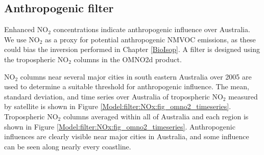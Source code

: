     
    
  
      
    
  \subsection{Anthropogenic filter}
    \label{Model:filter:NOx}
    
    Enhanced NO$_2$ concentrations indicate anthropogenic influence over Australia.
    We use NO$_2$ as a proxy for potential anthropogenic NMVOC emissions, as these could bias the inversion performed in Chapter \ref{BioIsop}.
    A filter is designed using the tropospheric NO$_2$ columns in the OMNO2d product.
    
    NO$_2$ columns near several major cities in south eastern Australia over 2005 are used to determine a suitable threshold for anthropogenic influence.
    The mean, standard deviation, and time series over Australia of tropospheric NO$_2$ measured by satellite is shown in Figure \ref{Model:filter:NOx:fig_omno2_timeseries}.
    Tropospheric NO$_2$ columns averaged within all of Australia and each region is shown in Figure \ref{Model:filter:NOx:fig_omno2_timeseries}.
    Anthropogenic influences are clearly visible near major cities in Australia, and some influence can be seen along nearly every coastline.
    
